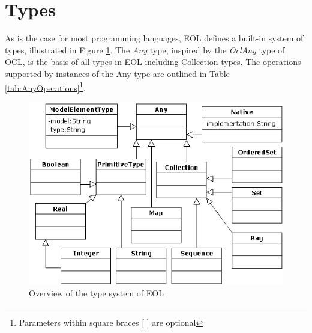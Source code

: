 \section{Types}
\label{sec:eol_types}

As is the case for most programming languages, EOL defines a built-in system of types, illustrated in Figure \ref{fig:EOLTypes}. The \emph{Any} type, inspired by the \emph{OclAny} type of OCL, is the basis of all types in EOL including Collection types. The operations supported by instances of the Any type are outlined in Table \ref{tab:AnyOperations}\footnote{Parameters within square braces [ ] are optional}.

\begin{figure}[t]
  \centering
  \includegraphics{images/EOLTypes.png}
  \caption{Overview of the type system of EOL}
  \label{fig:EOLTypes}
\end{figure}

\clearpage

